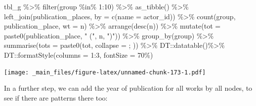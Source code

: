 \documentclass[
]{book}
\newenvironment{Shaded}{\begin{snugshade}}{\end{snugshade}}
\newcommand{\AttributeTok}[1]{\textcolor[rgb]{0.77,0.63,0.00}{#1}}
\newcommand{\DecValTok}[1]{\textcolor[rgb]{0.00,0.00,0.81}{#1}}
\newcommand{\FunctionTok}[1]{\textcolor[rgb]{0.00,0.00,0.00}{#1}}
\newcommand{\NormalTok}[1]{#1}
\newcommand{\OtherTok}[1]{\textcolor[rgb]{0.56,0.35,0.01}{#1}}
\newcommand{\SpecialCharTok}[1]{\textcolor[rgb]{0.00,0.00,0.00}{#1}}
\newcommand{\StringTok}[1]{\textcolor[rgb]{0.31,0.60,0.02}{#1}}
\begin{document}
\begin{Shaded}
\begin{Highlighting}[]
\NormalTok{tbl\_g }\SpecialCharTok{\%\textgreater{}\%} \FunctionTok{filter}\NormalTok{(group }\SpecialCharTok{\%in\%} \DecValTok{1}\SpecialCharTok{:}\DecValTok{10}\NormalTok{) }\SpecialCharTok{\%\textgreater{}\%} 
  \FunctionTok{as\_tibble}\NormalTok{() }\SpecialCharTok{\%\textgreater{}\%} 
  \FunctionTok{left\_join}\NormalTok{(publication\_places, }\AttributeTok{by =} \FunctionTok{c}\NormalTok{(}\StringTok{\textquotesingle{}name\textquotesingle{}} \OtherTok{=} \StringTok{\textquotesingle{}actor\_id\textquotesingle{}}\NormalTok{)) }\SpecialCharTok{\%\textgreater{}\%} 
  \FunctionTok{count}\NormalTok{(group, publication\_place, }\AttributeTok{wt =}\NormalTok{ n) }\SpecialCharTok{\%\textgreater{}\%} 
  \FunctionTok{arrange}\NormalTok{(}\FunctionTok{desc}\NormalTok{(n)) }\SpecialCharTok{\%\textgreater{}\%} 
  \FunctionTok{mutate}\NormalTok{(}\AttributeTok{tot =} \FunctionTok{paste0}\NormalTok{(publication\_place, }\StringTok{" ("}\NormalTok{, n, }\StringTok{")"}\NormalTok{)) }\SpecialCharTok{\%\textgreater{}\%} 
  \FunctionTok{group\_by}\NormalTok{(group) }\SpecialCharTok{\%\textgreater{}\%} \FunctionTok{summarise}\NormalTok{(}\AttributeTok{tots =} \FunctionTok{paste0}\NormalTok{(tot, }\AttributeTok{collapse =} \StringTok{\textquotesingle{}; \textquotesingle{}}\NormalTok{)) }\SpecialCharTok{\%\textgreater{}\%} 
\NormalTok{  DT}\SpecialCharTok{::}\FunctionTok{datatable}\NormalTok{()}\SpecialCharTok{\%\textgreater{}\%} 
\NormalTok{  DT}\SpecialCharTok{::}\FunctionTok{formatStyle}\NormalTok{(}\AttributeTok{columns =} \DecValTok{1}\SpecialCharTok{:}\DecValTok{3}\NormalTok{, }\AttributeTok{fontSize =} \StringTok{\textquotesingle{}70\%\textquotesingle{}}\NormalTok{)}
\end{Highlighting}
\end{Shaded}

\texttt{[image: \_main\_files/figure-latex/unnamed-chunk-173-1.pdf]}

In a further step, we can add the year of publication for all works by all nodes, to see if there are patterns there too:
\end{document}
